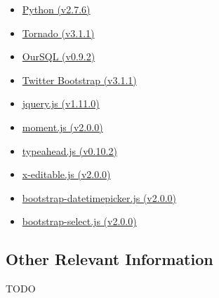 \documentclass{article}
\begin{document}
		\begin{itemize}
			\item \href{https://www.python.org/download/releases/2.7.6/}{Python (v2.7.6)}
			\item \href{http://www.tornadoweb.org/en/stable/}{Tornado (v3.1.1)}
			\item \href{https://pythonhosted.org/oursql/}{OurSQL (v0.9.2)}

			\item \href{http://getbootstrap.com/}{Twitter Bootstrap (v3.1.1)}

			\item \href{http://jquery.com/}{jquery.js (v1.11.0)}
			\item \href{http://momentjs.com/}{moment.js (v2.0.0)}
			\item \href{https://github.com/twitter/typeahead.js}{typeahead.js (v0.10.2)}

			\item \href{https://github.com/vitalets/x-editable}{x-editable.js (v2.0.0)}
			\item \href{https://github.com/Eonasdan/bootstrap-datetimepicker}{bootstrap-datetimepicker.js (v2.0.0)}
			\item \href{https://github.com/silviomoreto/bootstrap-select}{bootstrap-select.js (v2.0.0)}
		\end{itemize}

		\subsection[Other Information]{Other Relevant Information}
		TODO
\end{document}
